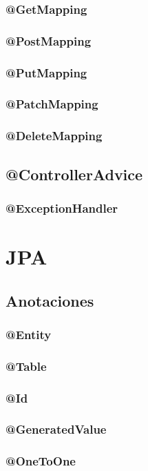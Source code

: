 \documentclass[12pt,article,oneside]{memoir}
\begin{document}
				\subsubsection{@GetMapping}
				\subsubsection{@PostMapping}
				\subsubsection{@PutMapping}
				\subsubsection{@PatchMapping}
				\subsubsection{@DeleteMapping}
			\subsection{@ControllerAdvice}
				\subsubsection{@ExceptionHandler}
	\newpage
		\section{JPA}
	\newpage
			\subsection{Anotaciones}
				\subsubsection{ @Entity }
				\subsubsection{ @Table }
				\subsubsection{ @Id }
				\subsubsection{ @GeneratedValue }
				\subsubsection{ @OneToOne }
\end{document}
